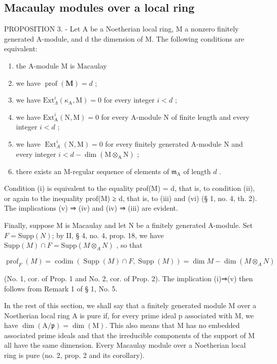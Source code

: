 \subsection{Macaulay modules over a local ring}

PROPOSITION 3. - Let A be a Noetherian local ring, M a nonzero finitely generated A-module, and d the dimension of M. The following conditions are equivalent:

\begin{enumerate}
\def\labelenumi{(\roman{enumi})}
\item
  the A-module M is Macaulay
\item
  we have \(\operatorname{prof}(\mathbf{M}) = d\) ;
\item
  we have \(\mathrm{Ext}_{\Lambda}^{i}(\kappa_{\mathrm{A}},\mathrm{M}) = 0\) for every integer \(i < d\) ;
\item
  we have \(\mathrm{Ext}_{\mathrm{A}}^{i}(\mathrm{N},\mathrm{M}) = 0\) for every A-module N of finite length and every integer \(i < d\) ;
\item
  we have \(\operatorname{Ext}_A^i (\mathrm{N},\mathrm{M}) = 0\) for every finitely generated A-module N and every integer \(i < d - \dim (\mathrm{M}\otimes_{\mathrm{A}}\mathrm{N})\) ;
\item
  there exists an M-regular sequence of elements of \(\mathfrak{m}_{\mathrm{A}}\) of length \(d\) .
\end{enumerate}

Condition (i) is equivalent to the equality prof(M) = d, that is, to condition (ii), or again to the inequality prof(M) ≥ d, that is, to (iii) and (vi) (§ 1, no. 4, th. 2). The implications (v) ⇒ (iv) and (iv) ⇒ (iii) are evident.

Finally, suppose M is Macaulay and let N be a finitely generated A-module. Set \(F = \text{Supp}(N)\); by II, § 4, no. 4, prop. 18, we have \(\text{Supp}(M) \cap F = \text{Supp}(M \otimes_{A} N)\) , so that

\[
\operatorname{prof} _ {F} (M) = \operatorname{codim} (\operatorname{Supp} (M) \cap F, \operatorname{Supp} (M)) = \dim M - \dim (M \otimes_ {A} N)
\]

(No. 1, cor. of Prop. 1 and No. 2, cor. of Prop. 2). The implication (i)⇒(v) then follows from Remark 1 of § 1, No. 5.

In the rest of this section, we shall say that a finitely generated module M over a Noetherian local ring A is pure if, for every prime ideal p associated with M, we have \(\dim(\mathrm{A}/\mathfrak{p}) = \dim(\mathrm{M})\). This also means that M has no embedded associated prime ideals and that the irreducible components of the support of M all have the same dimension. Every Macaulay module over a Noetherian local ring is pure (no. 2, prop. 2 and its corollary).

